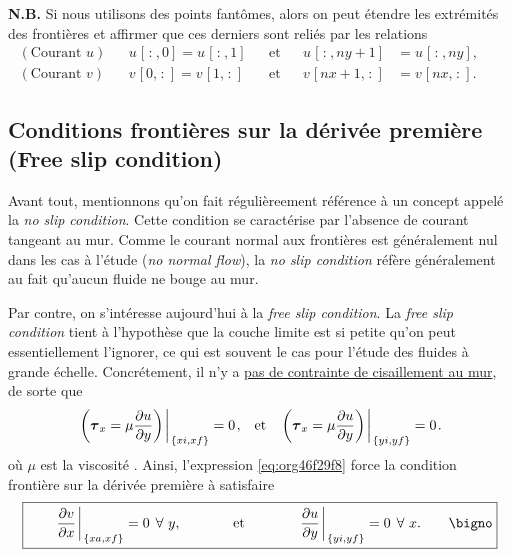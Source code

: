 \documentclass[10pt]{report}
\numberwithin{equation}{section}
\newcommand{\pt}{\hspace{1pt}} %
\begin{document}
\textbf{N.B.} Si nous utilisons des points fantômes, alors on peut étendre les extrémités des frontières et affirmer que ces derniers sont reliés par les relations
\begin{subequations}
\begin{align}
(\text{Courant }u) &&  u\pt[\pt:\pt,0] = u\pt[\pt:\pt,1] && \text{et} && u\pt[\pt:\pt,ny+1] &= u\pt[\pt:\pt,ny],&&\\
(\text{Courant }v) &&  v\pt[0,\pt:\pt] = v\pt[1,\pt:\pt] && \text{et} && v\pt[nx+1,\pt:\pt] &= v\pt[nx,\pt:\pt].&&
\end{align}
\end{subequations}

\subsection{Conditions frontières sur la dérivée première (Free slip condition)}
\label{sec:orgbdc036b}
Avant tout, mentionnons qu'on fait régulièreement référence à un concept appelé la \emph{no slip condition}.
Cette condition se caractérise par l'absence de courant tangeant au mur.
Comme le courant normal aux frontières est généralement nul dans les cas à l'étude (\emph{no normal flow}), la \emph{no slip condition} réfère généralement au fait qu'aucun fluide ne bouge au mur.\bigskip

Par contre, on s'intéresse aujourd'hui à la \emph{free slip condition}.
La \emph{free slip condition} tient à l'hypothèse que la couche limite est si petite qu'on peut essentiellement l'ignorer, ce qui est souvent le cas pour l'étude des fluides à grande échelle.
Concrétement, il n'y a \href{https://physics.stackexchange.com/questions/383096/understanding-free-slip-boundary-condition\#:\~:text=On\%20the\%20other\%20hand\%2C\%20the,the\%20tangential\%20component\%20is\%20unrestricted.}{pas de contrainte de cisaillement au mur}, de sorte que
\begin{align}
\label{eq:org46f29f8}
&&\eval{\qty(\boldsymbol{\tau}_x = \mu \pdv{u}{y})\pt }_{\pt\{xi,xf\}} = 0\pt, && \text{et} &&
  \eval{\qty(\boldsymbol{\tau}_x = \mu \pdv{u}{y})\pt }_{\pt\{yi,yf\}} = 0\pt. &&
\end{align}
où \(\mu\) est la viscosité \autocite{tan2018applying}.
Ainsi, l'expression \ref{eq:org46f29f8} force la condition frontière sur la dérivée première à satisfaire 
\begin{equation}
\boxed{\hspace{0.7cm}\eval{\pdv{v}{x}\pt }_{\pt\{xa,xf\}} = 0\pt\ \forall\ y,\hspace{1.3cm} \text{et} \hspace{1.3cm} \eval{\pdv{u}{y}\pt }_{\pt \{yi,yf\}} = 0\pt\ \forall\ x.\hspace{0.7cm}\bigno}
\end{equation}
\end{document}
